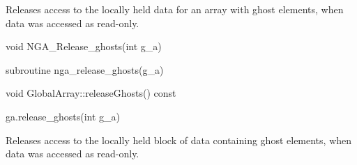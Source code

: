 \documentclass[12pt]{article}
\begin{document}
\begin{desc}

Releases access to the locally held data for an array with ghost elements, when
data was accessed as read-only.

\end{desc}



\begin{capi}
\begin{ccode}
void NGA_Release_ghosts(int g_a)
\end{ccode}
\begin{funcargs}
\end{funcargs}
\end{capi}

\begin{fapi}
\begin{fcode}
subroutine nga_release_ghosts(g_a)
\end{fcode}
\begin{funcargs}
\end{funcargs}
\end{fapi}

\begin{cxxapi}
\begin{cxxcode}
void GlobalArray::releaseGhosts() const
\end{cxxcode}
\end{cxxapi}

\begin{pyapi}
\begin{pycode}
ga.release_ghosts(int g_a)
\end{pycode}
\begin{funcargs}
\end{funcargs}
\end{pyapi}

\local

\begin{desc}

Releases access to the locally held block of data containing ghost elements,
when data was accessed as read-only.

\end{desc}


\end{document}
